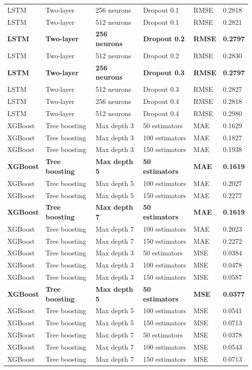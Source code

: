 \begin{landscape}
\begin{longtable}{p{2.2cm}p{3cm}p{3.5cm}p{3.2cm}p{1.6cm}p{1.8cm}}
LSTM & Two-layer & 256 neurons & Dropout 0.1 & RMSE & 0.2818 \\
LSTM & Two-layer & 512 neurons & Dropout 0.1 & RMSE & 0.2821 \\
\textbf{LSTM} & \textbf{Two-layer} & \textbf{256 neurons} & \textbf{Dropout 0.2} & \textbf{RMSE} & \textbf{0.2797} \\
LSTM & Two-layer & 512 neurons & Dropout 0.2 & RMSE & 0.2830 \\
\textbf{LSTM} & \textbf{Two-layer} & \textbf{256 neurons} & \textbf{Dropout 0.3} & \textbf{RMSE} & \textbf{0.2797} \\
LSTM & Two-layer & 512 neurons & Dropout 0.3 & RMSE & 0.2827 \\
LSTM & Two-layer & 256 neurons & Dropout 0.4 & RMSE & 0.2818 \\
LSTM & Two-layer & 512 neurons & Dropout 0.4 & RMSE & 0.2980 \\

XGBoost & Tree boosting & Max depth 3 & 50 estimators  & MAE  & 0.1629 \\
XGBoost & Tree boosting & Max depth 3 & 100 estimators & MAE  & 0.1827 \\
XGBoost & Tree boosting & Max depth 3 & 150 estimators & MAE  & 0.1938 \\
\textbf{XGBoost} & \textbf{Tree boosting} & \textbf{Max depth 5} & \textbf{50 estimators} & \textbf{MAE} & \textbf{0.1619} \\
XGBoost & Tree boosting & Max depth 5 & 100 estimators & MAE  & 0.2027 \\
XGBoost & Tree boosting & Max depth 5 & 150 estimators & MAE  & 0.2277 \\
\textbf{XGBoost} & \textbf{Tree boosting} & \textbf{Max depth 7} & \textbf{50 estimators} & \textbf{MAE} & \textbf{0.1619} \\
XGBoost & Tree boosting & Max depth 7 & 100 estimators & MAE  & 0.2023 \\
XGBoost & Tree boosting & Max depth 7 & 150 estimators & MAE  & 0.2272 \\

XGBoost & Tree boosting & Max depth 3 & 50 estimators  & MSE  & 0.0384 \\
XGBoost & Tree boosting & Max depth 3 & 100 estimators & MSE  & 0.0478 \\
XGBoost & Tree boosting & Max depth 3 & 150 estimators & MSE  & 0.0587 \\
\textbf{XGBoost} & \textbf{Tree boosting} & \textbf{Max depth 5} & \textbf{50 estimators} & \textbf{MSE} & \textbf{0.0377} \\
XGBoost & Tree boosting & Max depth 5 & 100 estimators & MSE  & 0.0541 \\
XGBoost & Tree boosting & Max depth 5 & 150 estimators & MSE  & 0.0713 \\
XGBoost & Tree boosting & Max depth 7 & 50 estimators  & MSE  & 0.0378 \\
XGBoost & Tree boosting & Max depth 7 & 100 estimators & MSE  & 0.0543 \\
XGBoost & Tree boosting & Max depth 7 & 150 estimators & MSE  & 0.0713 \\


\end{longtable}
\end{landscape}
